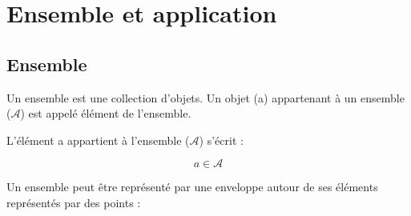 
\chapter{Ensemble et application}

\section{Ensemble}
Un ensemble est une collection d'objets. Un objet (a) appartenant à un ensemble ($\mathcal{A}$) est appelé élément de l'ensemble.

L'élément a appartient à l'ensemble ($\mathcal{A}$) s'écrit :

\[
 a \in \mathcal{A}
\]

Un ensemble peut être représenté par une enveloppe autour de ses éléments représentés par des points :



\begin{center}
\end{center}

